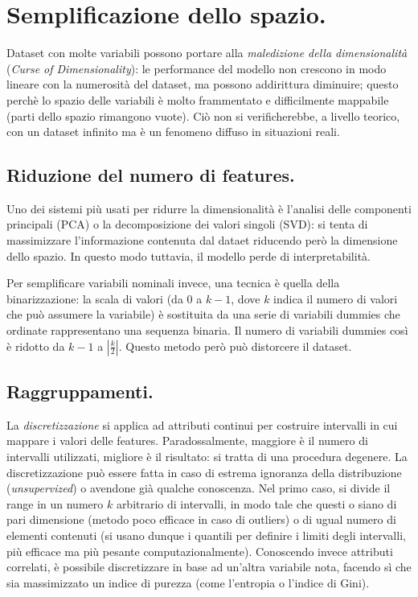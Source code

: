 \documentclass[11pt, a4page, twocolumn]{article}
\begin{document}
\section{Semplificazione dello spazio.}
Dataset con molte variabili possono portare alla \textit{maledizione della dimensionalità} (\textit{Curse of Dimensionality}): le performance del modello non crescono in modo lineare con la numerosità del dataset, ma possono addirittura diminuire; questo perchè lo spazio delle variabili è molto frammentato e difficilmente mappabile (parti dello spazio rimangono vuote).
Ciò non si verificherebbe, a livello teorico, con un dataset infinito ma è un fenomeno diffuso in situazioni reali.

\subsection{Riduzione del numero di features.}
Uno dei sistemi più usati per ridurre la dimensionalità è l'analisi delle componenti principali (PCA) o la decomposizione dei valori singoli (SVD): si tenta di massimizzare l'informazione contenuta dal dataet riducendo però la dimensione dello spazio.
In questo modo tuttavia, il modello perde di interpretabilità.

Per semplificare variabili nominali invece, una tecnica è quella della binarizzazione: la scala di valori (da $0$ a $k-1$, dove $k$ indica il numero di valori che può assumere la variabile) è sostituita da una serie di variabili dummies che ordinate rappresentano una sequenza binaria.
Il numero di variabili dummies così è ridotto da $k-1$ a $|\frac{k}{2}|$.
Questo metodo però può distorcere il dataset.

\subsection{Raggruppamenti.}
La \textit{discretizzazione} si applica ad attributi continui per costruire intervalli in cui mappare i valori delle features.
Paradossalmente, maggiore è il numero di intervalli utilizzati, migliore è il risultato: si tratta di una procedura degenere.
La discretizzazione può essere fatta in caso di estrema ignoranza della distribuzione (\textit{unsupervized}) o avendone già qualche conoscenza.
Nel primo caso, si divide il range in un numero $k$ arbitrario di intervalli, in modo tale che questi o siano di pari dimensione (metodo poco efficace in caso di outliers) o di ugual numero di elementi contenuti (si usano dunque i quantili per definire i limiti degli intervalli, più efficace ma più pesante computazionalmente).
Conoscendo invece attributi correlati, è possibile discretizzare in base ad un'altra variabile nota, facendo sì che sia massimizzato un indice di purezza (come l'entropia o l'indice di Gini).
\end{document}
